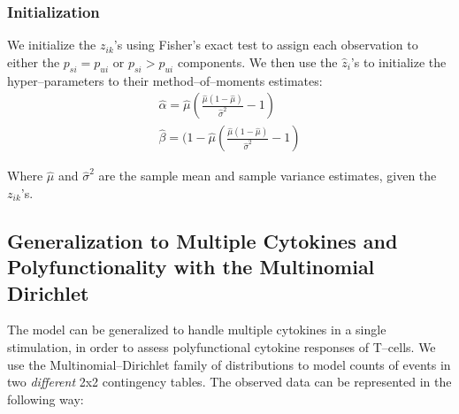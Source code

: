 \documentclass[11pt]{article}
\begin{document}
\subsubsection*{Initialization}
We initialize the $z_{ik}$'s using Fisher's exact test to assign each observation to either the $p_{si}=p_{ui}$ or $p_{si} > p_{ui}$ components. We then use the $\hat{z}_i$'s to initialize the hyper--parameters to their method--of--moments estimates:
\begin{align}
\hat{\alpha} = \hat{\mu}\left(\frac{\hat{\mu}(1-\hat{\mu})}{\hat{\sigma}^2} -1\right)\\
\hat{\beta} =  (1-\hat{\mu}\left(\frac{\hat{\mu}(1-\hat{\mu})}{\hat{\sigma}^2} -1\right)
\end{align}

Where $\hat{\mu}$ and $\hat{\sigma}^2$ are the sample mean and sample variance estimates, given the $z_{ik}$'s.

\subsection*{Generalization to Multiple Cytokines and Polyfunctionality with the Multinomial Dirichlet}
The model can be generalized to handle multiple cytokines in a single stimulation, in order to assess polyfunctional cytokine responses of T--cells. We use the Multinomial--Dirichlet family of distributions to model counts of events in two \textit{different} 2x2 contingency tables. The observed data can be represented in the following way: 
\end{document}
